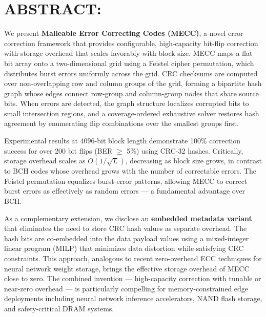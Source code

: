 \section*{ABSTRACT:}
\noindent
We present \textbf{Malleable Error Correcting Codes (MECC)}, a novel error correction framework that provides configurable, high-capacity bit-flip correction with storage overhead that scales favorably with block size.
MECC maps a flat bit array onto a two-dimensional grid using a Feistel cipher permutation, which distributes burst errors uniformly across the grid.
CRC checksums are computed over non-overlapping row and column groups of the grid, forming a bipartite hash graph whose edges connect row-group and column-group nodes that share source bits.
When errors are detected, the graph structure localizes corrupted bits to small intersection regions, and a coverage-ordered exhaustive solver restores hash agreement by enumerating flip combinations over the smallest groups first.

Experimental results at 4096-bit block length demonstrate 100\% correction success for over 200 bit flips (BER $\geq$ 5\%) using CRC-32 hashes.
Critically, storage overhead scales as $O(1/\sqrt{L})$, decreasing as block size grows, in contrast to BCH codes whose overhead grows with the number of correctable errors.
The Feistel permutation equalizes burst-error patterns, allowing MECC to correct burst errors as effectively as random errors --- a fundamental advantage over BCH.

As a complementary extension, we disclose an \textbf{embedded metadata variant} that eliminates the need to store CRC hash values as separate overhead.
The hash bits are co-embedded into the data payload values using a mixed-integer linear program (MILP) that minimizes data distortion while satisfying CRC constraints.
This approach, analogous to recent zero-overhead ECC techniques for neural network weight storage, brings the effective storage overhead of MECC close to zero.
The combined invention --- high-capacity correction with tunable or near-zero overhead --- is particularly compelling for memory-constrained edge deployments including neural network inference accelerators, NAND flash storage, and safety-critical DRAM systems.

